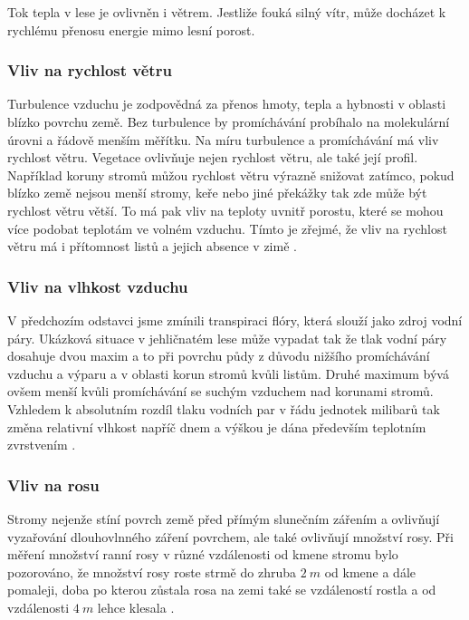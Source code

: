 Tok tepla v lese je ovlivněn i větrem. Jestliže fouká silný vítr, může docházet k rychlému přenosu energie mimo lesní porost\cite{alma}. 

\subsubsection{Vliv na rychlost větru}
Turbulence vzduchu je zodpovědná za přenos hmoty, tepla a hybnosti v oblasti blízko povrchu země. Bez turbulence by promíchávání probíhalo na molekulární úrovni a řádově menším měřítku. Na míru turbulence a promíchávání má vliv rychlost větru. Vegetace ovlivňuje nejen rychlost větru, ale také její profil. Například koruny stromů můžou rychlost větru výrazně snižovat zatímco, pokud blízko země nejsou menší stromy, keře nebo jiné překážky tak zde může být rychlost větru větší. To má pak vliv na teploty uvnitř porostu, které se mohou více podobat teplotám ve volném vzduchu. Tímto je zřejmé, že vliv na rychlost větru má i přítomnost listů a jejich absence v zimě \cite{alma}. 

\subsubsection{Vliv na vlhkost vzduchu}
V předchozím odstavci jsme zmínili transpiraci flóry, která slouží jako zdroj vodní páry. Ukázková situace v jehličnatém lese může vypadat tak že tlak vodní páry dosahuje dvou maxim a to při povrchu půdy z důvodu nižšího promíchávání vzduchu a výparu a v oblasti korun stromů kvůli listům. Druhé maximum bývá ovšem menší kvůli promíchávání se suchým vzduchem nad korunami stromů. Vzhledem k absolutním rozdíl tlaku vodních par v řádu jednotek milibarů tak změna relativní vlhkost napříč dnem a výškou je dána především teplotním zvrstvením \cite{alma}. 

\subsubsection{Vliv na rosu}
Stromy nejenže stíní povrch země před přímým slunečním zářením a ovlivňují vyzařování dlouhovlnného záření povrchem, ale také ovlivňují množství rosy. Při měření množství ranní rosy v různé vzdálenosti od kmene stromu bylo pozorováno, že množství rosy roste strmě do zhruba $\SI{2}{m}$ od kmene a dále pomaleji, doba po kterou zůstala rosa na zemi také se vzdáleností rostla a od vzdálenosti $\SI{4}{m}$ lehce klesala \cite{alma}.


